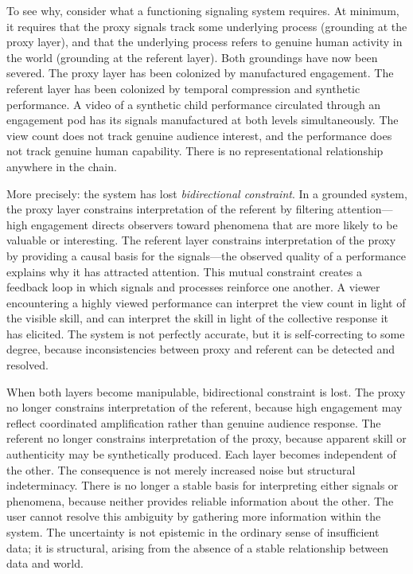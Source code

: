\documentclass[12pt, a4paper]{article}
\begin{document}
To see why, consider what a functioning signaling system requires. At minimum, it requires that the proxy signals track some underlying process (grounding at the proxy layer), and that the underlying process refers to genuine human activity in the world (grounding at the referent layer). Both groundings have now been severed. The proxy layer has been colonized by manufactured engagement. The referent layer has been colonized by temporal compression and synthetic performance. A video of a synthetic child performance circulated through an engagement pod has its signals manufactured at both levels simultaneously. The view count does not track genuine audience interest, and the performance does not track genuine human capability. There is no representational relationship anywhere in the chain.

More precisely: the system has lost \textit{bidirectional constraint}. In a grounded system, the proxy layer constrains interpretation of the referent by filtering attention---high engagement directs observers toward phenomena that are more likely to be valuable or interesting. The referent layer constrains interpretation of the proxy by providing a causal basis for the signals---the observed quality of a performance explains why it has attracted attention. This mutual constraint creates a feedback loop in which signals and processes reinforce one another. A viewer encountering a highly viewed performance can interpret the view count in light of the visible skill, and can interpret the skill in light of the collective response it has elicited. The system is not perfectly accurate, but it is self-correcting to some degree, because inconsistencies between proxy and referent can be detected and resolved.

When both layers become manipulable, bidirectional constraint is lost. The proxy no longer constrains interpretation of the referent, because high engagement may reflect coordinated amplification rather than genuine audience response. The referent no longer constrains interpretation of the proxy, because apparent skill or authenticity may be synthetically produced. Each layer becomes independent of the other. The consequence is not merely increased noise but structural indeterminacy. There is no longer a stable basis for interpreting either signals or phenomena, because neither provides reliable information about the other. The user cannot resolve this ambiguity by gathering more information within the system. The uncertainty is not epistemic in the ordinary sense of insufficient data; it is structural, arising from the absence of a stable relationship between data and world.
\end{document}
